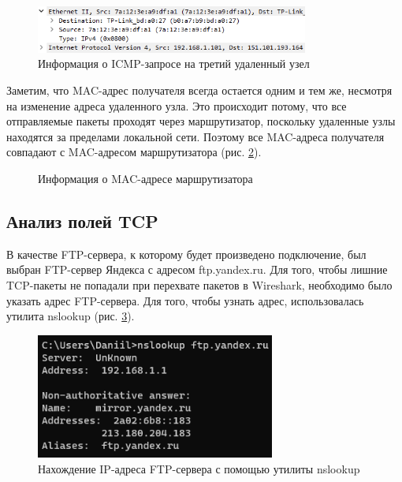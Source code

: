 \documentclass[a4paper, 14pt]{extarticle}
\begin{document}
\begin{figure}[H]
  \centering
  \includegraphics[width=0.8\textwidth]{images/icmp-remote-3.png}
  \caption{Информация о ICMP-запросе на третий удаленный узел}
  \label{fig:icmp-remote-3}
\end{figure}

Заметим, что MAC-адрес получателя всегда остается одним и тем же, несмотря на
изменение адреса удаленного узла. Это происходит потому, что все отправляемые
пакеты проходят через маршрутизатор, поскольку удаленные узлы находятся за
пределами локальной сети. Поэтому все MAC-адреса получателя совпадают с
MAC-адресом маршрутизатора (рис. \ref{fig:router-mac}).

\begin{figure}[H]
  \centering
  \caption{Информация о MAC-адресе маршрутизатора}
  \label{fig:router-mac}
\end{figure}

\subsection{Анализ полей TCP}

В качестве FTP-сервера, к которому будет произведено подключение, был выбран
FTP-сервер Яндекса с адресом ftp.yandex.ru. Для того, чтобы лишние TCP-пакеты не
попадали при перехвате пакетов в Wireshark, необходимо было указать адрес
FTP-сервера. Для того, чтобы узнать адрес, использовалась утилита nslookup (рис.
\ref{fig:nslookup}).

\begin{figure}[H]
  \centering
  \includegraphics[width=0.7\textwidth]{images/nslookup.png}
  \caption{Нахождение IP-адреса FTP-сервера с помощью утилиты nslookup}
  \label{fig:nslookup}
\end{figure}
\end{document}
